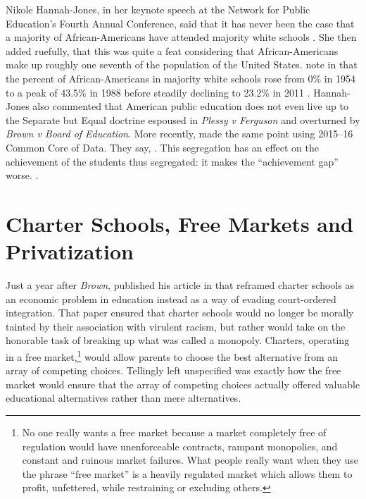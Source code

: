 Nikole Hannah-Jones, in her keynote speech at the Network for Public Education's Fourth Annual Conference, said that it has never been the case that a majority of African-Americans have attended majority white schools \parencite{Hannah-Jones2017}. She then added ruefully, that this was quite a feat considering that African-Americans make up roughly one seventh of the population of the United States. \citeauthor{Orfield.Frankenberg2014} note in that the percent of African-Americans in majority white schools rose from 0\% in 1954 to a peak of 43.5\% in 1988 before steadily declining to 23.2\% in 2011 \parencites()(Table 3: Percent of Black Students in Majority White Schools, 1954–2011)[10]{Orfield.Frankenberg2014}. Hannah-Jones also commented that American public education does not even live up to the Separate but Equal doctrine espoused in \textit{Plessy v Ferguson} and overturned by \textit{Brown v Board of Education}. More recently, \citeauthor{Heilig.etal2019a} made the same point using 2015--16 Common Core of Data. They say,
.
This segregation has an effect on the achievement of the students thus segregated: it makes the ``achievement gap'' worse.
.

\section{Charter Schools, Free Markets  and Privatization}\label{sec:freemarkets}\indent

Just a year after \textit{Brown},  \textcite{Friedman1955} published his article  in  \parencite{Friedman1955} that reframed charter schools as an economic problem in education instead as a way of evading court-ordered integration. That paper ensured that charter schools would no longer be morally tainted by their association with virulent racism, but rather would take on the honorable task of breaking up what was called a monopoly. Charters, operating in a free market,\footnote{No one really wants a free market because a  market completely free of regulation would have unenforceable contracts, rampant monopolies, and constant and ruinous market failures. What people really want when they use the phrase ``free market'' is a heavily regulated market which allows them to profit, unfettered, while restraining or excluding others.} would allow parents to choose the best alternative from an array of competing choices. Tellingly left unspecified was exactly how the free market would ensure that the array of competing choices actually offered valuable educational alternatives rather than mere alternatives.

